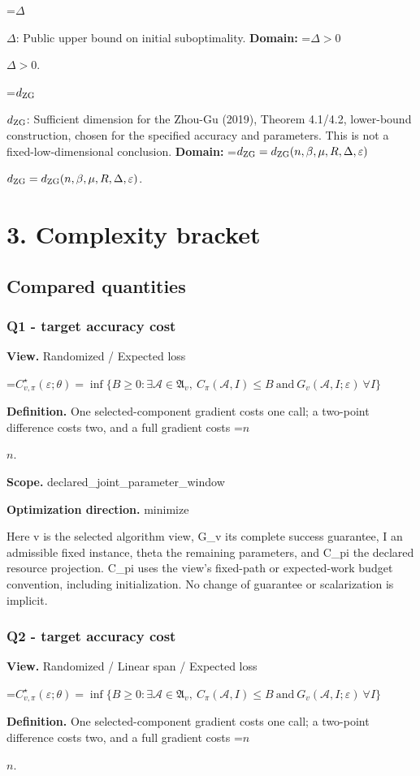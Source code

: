 \documentclass[10pt,a4paper]{article}
\newcommand{\AtlasMath}[1]{\par\begingroup\centering\setbox0=\hbox{$\displaystyle #1$}\ifdim\wd0>1.4\linewidth\typeout{ATLAS WIDE FORMULA: \the\wd0}\fi\ifdim\wd0>\linewidth\resizebox{\linewidth}{!}{\box0}\else\box0\fi\par\endgroup}
\newcommand{\AtlasInlineMath}[1]{\begingroup\setbox0=\hbox{$#1$}\ifdim\wd0>.4\linewidth\endgroup\AtlasMath{#1}\else\endgroup$#1$\fi}
\begin{document}
\AtlasInlineMath{\Delta}: Public upper bound on initial suboptimality. \textbf{Domain:} \AtlasInlineMath{\Delta>0}.

\AtlasInlineMath{d_{\rm ZG}}: Sufficient dimension for the Zhou-Gu (2019), Theorem 4.1/4.2, lower-bound construction, chosen for the specified accuracy and parameters. This is not a fixed-low-dimensional conclusion. \textbf{Domain:} \AtlasInlineMath{d_{\rm ZG}=d_{\rm ZG}(n,\beta,\mu,R,\Delta,\varepsilon)}.

\section{3. Complexity bracket}
\subsection{Compared quantities}
\subsubsection{Q1 - target accuracy cost}
\textbf{View.} Randomized / Expected loss

\AtlasMath{C^\star_{v,\pi}(\varepsilon;\theta)=\inf\{B\ge0:\exists\mathcal A\in\mathfrak A_v,\ C_\pi(\mathcal A,I)\le B\ \text{and}\ G_v(\mathcal A,I;\varepsilon)\ \forall I\}}
\textbf{Definition.} One selected-component gradient costs one call; a two-point difference costs two, and a full gradient costs \AtlasInlineMath{n}.

\textbf{Scope.} declared\_joint\_parameter\_window

\textbf{Optimization direction.} minimize

Here v is the selected algorithm view, G\_v its complete success guarantee, I an admissible fixed instance, theta the remaining parameters, and C\_pi the declared resource projection. C\_pi uses the view's fixed-path or expected-work budget convention, including initialization. No change of guarantee or scalarization is implicit.

\subsubsection{Q2 - target accuracy cost}
\textbf{View.} Randomized / Linear span / Expected loss

\AtlasMath{C^\star_{v,\pi}(\varepsilon;\theta)=\inf\{B\ge0:\exists\mathcal A\in\mathfrak A_v,\ C_\pi(\mathcal A,I)\le B\ \text{and}\ G_v(\mathcal A,I;\varepsilon)\ \forall I\}}
\textbf{Definition.} One selected-component gradient costs one call; a two-point difference costs two, and a full gradient costs \AtlasInlineMath{n}.
\end{document}

